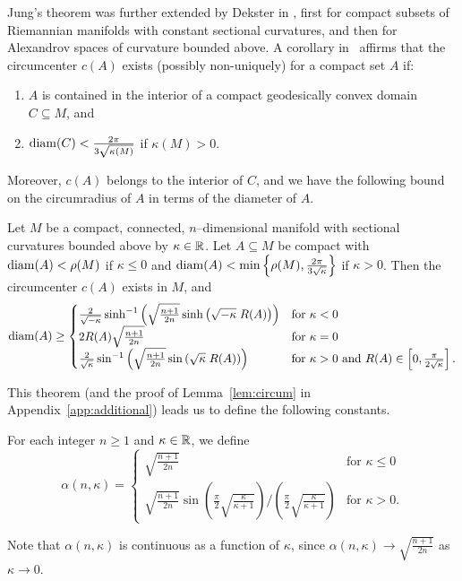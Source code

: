 \documentclass[11pt, reqno, english]{amsart}
\begin{document}
Jung's theorem was further extended by Dekster in
\cite{Dekster1985AnEO,Dekster1995TheJT,Dekster1997}, first for compact subsets of Riemannian manifolds with constant sectional curvatures, and then for Alexandrov spaces of curvature bounded above.
A corollary in~\cite[Section 2]{Dekster1997} affirms that the circumcenter $c(A)$ exists (possibly non-uniquely) for a compact set $A$ if:
\begin{enumerate}
\item $A$ is contained in the interior of a compact geodesically convex domain
$C\subseteq M$, and
\item $\mathrm{diam}(C)<\frac{2\pi}{3\sqrt{\kappa(M)}}$ if $\kappa(M)>0$.
\end{enumerate}
Moreover, $c(A)$ belongs to the interior of $C$, and we have the
following bound on the circumradius of $A$ in terms of the diameter of $A$.

\vspace{3mm}
\begin{theorem}
\label{thm:Jung}
Let $M$ be a compact, connected, $n$--dimensional manifold with sectional curvatures bounded above by $\kappa\in\mathbb{R}$. 
Let $A\subseteq M$ be compact with $\mathrm{diam}(A)<\rho(M)$ if $\kappa\le 0$ and $\mathrm{diam}(A)<\min\left\{\rho(M),\tfrac{2\pi}{3\sqrt{\kappa}}\right\}$ if $\kappa>0$.
Then the circumcenter $c(A)$ exists in $M$, and
\[
\mathrm{diam}(A)\geq\begin{cases}
\frac{2}{\sqrt{-\kappa}}\sinh^{-1}\left(\sqrt{\frac{n+1}{2n}}
\sinh\left(\sqrt{-\kappa}\;R(A)\right)\right) &\text{for }\kappa<0\\
2R(A)\sqrt{\frac{n+1}{2n}} &\text{for }\kappa=0 \\
\frac{2}{\sqrt{\kappa}}\sin^{-1}\left(\sqrt{\frac{n+1}{2n}}
\sin\left(\sqrt{\kappa}\;R(A)\right)\right) 
&\text{for }\kappa>0\text{ and }R(A)\in
\left[0,\tfrac{\pi}{2\sqrt{\kappa}}\right].
\end{cases}
\]
\end{theorem}

This theorem (and the proof of Lemma~\ref{lem:circum} in Appendix~\ref{app:additional}) leads us to define the following constants.

\vspace{3mm}
\begin{definition}
\label{def:alpha}
For each integer $n\ge 1$ and $\kappa\in\mathbb{R}$, we define
\[
\alpha(n,\kappa)=\begin{cases}
\sqrt{\tfrac{n+1}{2n}}&\text{for }\kappa\leq0 \\
\sqrt{\tfrac{n+1}{2n}}\sin\left(\tfrac{\pi}{2}\sqrt{\frac{\kappa}{\kappa+1}}\right)/\left(\tfrac{\pi}{2}\sqrt{\frac{\kappa}{\kappa+1}}\right)&\text{for }\kappa>0.
\end{cases}
\]
\end{definition}
\noindent Note that $\alpha(n,\kappa)$ is continuous as a function of $\kappa$, since $\alpha(n,\kappa)\to\sqrt{\frac{n+1}{2n}}$ as $\kappa\to0$. 
\end{document}
